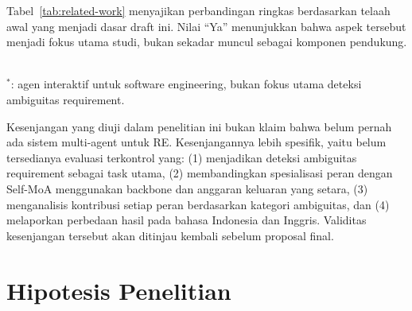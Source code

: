 Tabel~\ref{tab:related-work} menyajikan perbandingan ringkas berdasarkan telaah awal yang menjadi dasar draft ini. Nilai ``Ya'' menunjukkan bahwa aspek tersebut menjadi fokus utama studi, bukan sekadar muncul sebagai komponen pendukung.

\begin{table}[htbp]
\centering
\caption{Perbandingan penelitian terkait dengan draft penelitian ini}
\label{tab:related-work}
\renewcommand{\arraystretch}{1.2}
\\[-1mm]
\small{$^*$: agen interaktif untuk software engineering, bukan fokus utama deteksi ambiguitas requirement.}
\end{table}

Kesenjangan yang diuji dalam penelitian ini bukan klaim bahwa belum pernah ada sistem multi-agent untuk RE. Kesenjangannya lebih spesifik, yaitu belum tersedianya evaluasi terkontrol yang: (1) menjadikan deteksi ambiguitas requirement sebagai task utama, (2) membandingkan spesialisasi peran dengan Self-MoA menggunakan backbone dan anggaran keluaran yang setara, (3) menganalisis kontribusi setiap peran berdasarkan kategori ambiguitas, dan (4) melaporkan perbedaan hasil pada bahasa Indonesia dan Inggris. Validitas kesenjangan tersebut akan ditinjau kembali sebelum proposal final.

\section{Hipotesis Penelitian}

